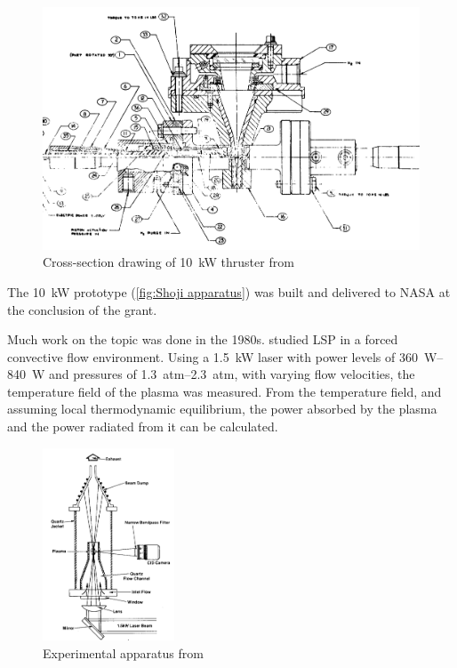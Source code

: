         \begin{figure}[h]
            \centering
            \includegraphics[width=\textwidth]{assets/2 background/Shoji cross-section.png}
            \caption{Cross-section drawing of \qty{10}{kW} thruster from \textcite{shojiLaserheatedRocketThruster1977}}
            \label{fig:Shoji cross-section}
        \end{figure}

        The \qty{10}{kW} prototype (\autoref{fig:Shoji apparatus}) was built and delivered to NASA at the conclusion of the grant.


        
        

        Much work on the topic was done in the 1980s. \textcite{keeferPowerAbsorptionLasersustained1986a} studied LSP in a forced convective flow environment. Using a \qty{1.5}{kW}  laser with power levels of \qtyrange{360}{840}{W} and pressures of \qtyrange{1.3}{2.3}{atm}, with varying flow velocities, the temperature field of the plasma was measured. From the temperature field, and assuming local thermodynamic equilibrium, the power absorbed by the plasma and the power radiated from it can be calculated.

        \begin{figure}[h]
            \centering
            \includegraphics[width=0.35\textwidth]{assets/2 background/UTSI (Keefer) Apparatus.png}
            \caption{Experimental apparatus from \textcite{keeferPowerAbsorptionLasersustained1986a}}
            \label{fig:Keefer apparatus}
        \end{figure}
        
